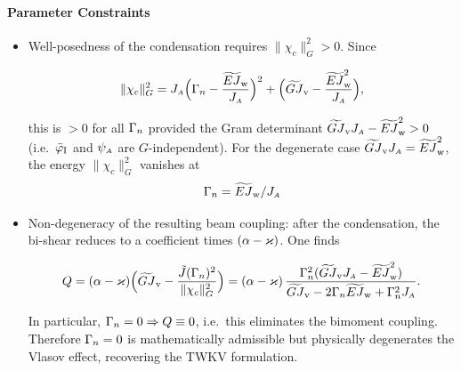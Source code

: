 \paragraph{Parameter Constraints}


\begin{itemize}
\tightlist
\item
  Well-posedness of the condensation requires
  \(\|\chi_c\|_G^2>0\). Since


\[\|\chi_c\|_G^2
= J_{\scriptscriptstyle{A}}\Big(\Gamma_{n}-\frac{\widetilde{EJ}_{\mathrm{w}}}{J_{\scriptscriptstyle{A}}}\Big)^2+\Big(\widetilde{GJ}_{\mathrm{v}}-\frac{\widetilde{EJ}_{\mathrm{w}}^2}{J_{\scriptscriptstyle{A}}}\Big),\]

this is \(>0\) for all \(\Gamma_{n}\) provided the Gram determinant
\(\widetilde{GJ}_{\mathrm{v}}J_{\scriptscriptstyle{A}}-\widetilde{EJ}_{\mathrm{w}}^2>0\) (i.e.~\(\bar{\varphi}_{\rm I}\) and \(\psi_{\scriptscriptstyle{A}}\) are
\(G\)-independent). 
For the degenerate case \(\widetilde{GJ}_{\mathrm{v}}J_{\scriptscriptstyle{A}}=\widetilde{EJ}_{\mathrm{w}}^2\), the energy \(\|\chi_c\|_G^2\)
vanishes at 
\[
\Gamma_{n}=\widetilde{EJ}_{\mathrm{w}}/J_{\scriptscriptstyle{A}}
\]

\item Non-degeneracy of the resulting beam coupling:
after the condensation, the bi-shear reduces to a
coefficient times \((\alpha-\varkappa)\). 
One finds 

\[
Q = (\alpha-\varkappa)\Big(\widetilde{GJ}_{\mathrm{v}}-\frac{\tilde J(\Gamma_{n})^2}{\|\chi_c\|_G^2}\Big)
   = (\alpha-\varkappa)\,\frac{\Gamma_{n}^2(\widetilde{GJ}_{\mathrm{v}}J_{\scriptscriptstyle{A}}-\widetilde{EJ}_{\mathrm{w}}^2)}{\widetilde{GJ}_{\mathrm{v}}-2\Gamma_{n}\widetilde{EJ}_{\mathrm{w}}+\Gamma_{n}^2J_{\scriptscriptstyle{A}}}.
\]

In particular, \(\Gamma_{n}=0\Rightarrow Q\equiv 0\), i.e.~this eliminates the
bimoment coupling. 
Therefore \(\Gamma_{n}=0\) is mathematically admissible but
physically degenerates the Vlasov effect, recovering the TWKV formulation.
\end{itemize}
